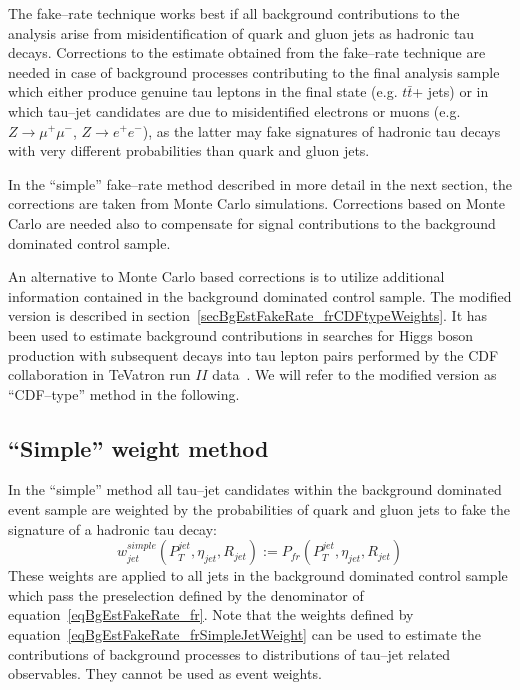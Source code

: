 The fake--rate technique works best if all background contributions to the analysis 
arise from misidentification of quark and gluon jets as hadronic tau decays. 
Corrections to the estimate obtained from the fake--rate technique  
are needed in case of background processes contributing to the final analysis sample
which either produce genuine tau leptons in the final state (e.g. $t\bar{t}$+ jets)
or in which tau--jet candidates are due to misidentified electrons or muons
(e.g. $Z \rightarrow \mu^{+} \mu^{-}$, $Z \rightarrow e^{+} e^{-}$),
as the latter may fake signatures of hadronic tau decays with very different probabilities than quark and gluon jets.

In the ``simple'' fake--rate method described in more detail in the next section, 
the corrections are taken from Monte Carlo simulations.
Corrections based on Monte Carlo are needed also to compensate for signal contributions to the background dominated control sample.

An alternative to Monte Carlo based corrections is to utilize additional information 
contained in the background dominated control sample.
The modified version is described in section~\ref{secBgEstFakeRate_frCDFtypeWeights}.
It has been used to estimate background contributions in searches for Higgs boson production
with subsequent decays into tau lepton pairs performed by the CDF collaboration in TeVatron run $II$ data~\cite{CDFtypeFakeRateMethod}.
We will refer to the modified version as ``CDF--type'' method in the following.


\subsection{``Simple'' weight method}

In the ``simple'' method all tau--jet candidates within the background dominated event sample are weighted
by the probabilities of quark and gluon jets to fake the signature of a hadronic tau decay:
\begin{equation}
w_{jet}^{simple} \left( P_{T}^{jet}, \eta_{jet}, R_{jet} \right) := P_{fr} \left( P_{T}^{jet}, \eta_{jet}, R_{jet} \right)
\label{eqBgEstFakeRate_frSimpleJetWeight}
\end{equation}
These weights are applied to all jets in the background dominated control sample which pass the preselection defined by 
the denominator of equation~\ref{eqBgEstFakeRate_fr}.
Note that the weights defined by equation~\ref{eqBgEstFakeRate_frSimpleJetWeight} can be used to estimate
the contributions of background processes to distributions of tau--jet related observables.
They cannot be used as event weights.

